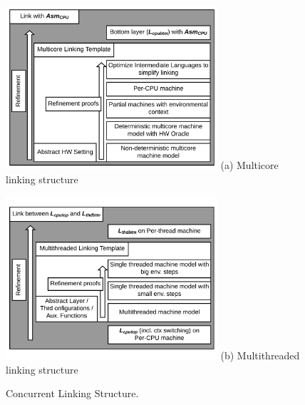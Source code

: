 

\begin{figure}
\begin{center}
\includegraphics[width=0.7\textwidth]{figs/conlink/cpu_linking_structure}\newline
(a) Multicore linking structure
\end{center}
\begin{center}
\includegraphics[width=0.7\textwidth]{figs/conlink/thread_linking_structure}\newline
(b) Multithreaded linking structure
\end{center}
\caption{Concurrent Linking Structure.}
\label{fig:chapter:conlink:concurrent-linking-structure}
\end{figure}

